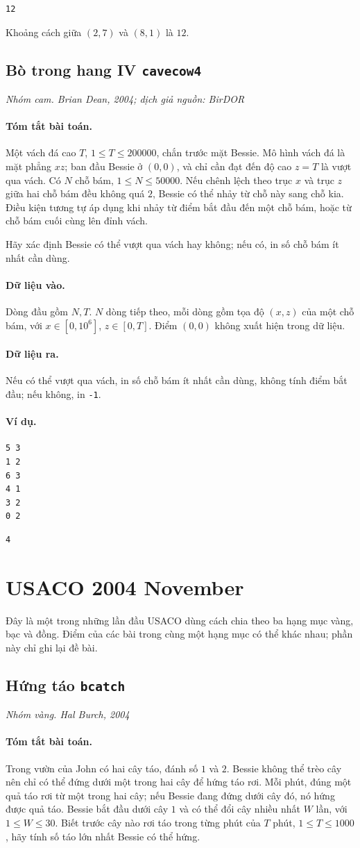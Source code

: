 \documentclass[11pt]{article}
\newcommand{\problem}[4]{%
  \subsection[#1 (#2)]{#1 \hfill {\normalsize\texttt{#2}}}%
  \noindent\textit{#3. #4}\par\smallskip
}
\newcommand{\iosec}[1]{\paragraph{#1}}
\begin{document}
\begin{verbatim}
12
\end{verbatim}

Khoảng cách giữa \((2,7)\) và \((8,1)\) là \(12\).

\problem{Bò trong hang IV}{cavecow4}{Nhóm cam}{Brian Dean, 2004; dịch giả nguồn: BirDOR}

\iosec{Tóm tắt bài toán.}
Một vách đá cao \(T\), \(1\le T\le 200000\), chắn trước mặt Bessie. Mô hình vách
đá là mặt phẳng \(xz\); ban đầu Bessie ở \((0,0)\), và chỉ cần đạt đến độ cao
\(z=T\) là vượt qua vách. Có \(N\) chỗ bám, \(1\le N\le 50000\). Nếu chênh lệch
theo trục \(x\) và trục \(z\) giữa hai chỗ bám đều không quá \(2\), Bessie có
thể nhảy từ chỗ này sang chỗ kia. Điều kiện tương tự áp dụng khi nhảy từ điểm
bắt đầu đến một chỗ bám, hoặc từ chỗ bám cuối cùng lên đỉnh vách.

Hãy xác định Bessie có thể vượt qua vách hay không; nếu có, in số chỗ bám ít
nhất cần dùng.

\iosec{Dữ liệu vào.}
Dòng đầu gồm \(N,T\). \(N\) dòng tiếp theo, mỗi dòng gồm tọa độ \((x,z)\) của
một chỗ bám, với \(x\in[0,10^6]\), \(z\in[0,T]\). Điểm \((0,0)\) không xuất
hiện trong dữ liệu.

\iosec{Dữ liệu ra.}
Nếu có thể vượt qua vách, in số chỗ bám ít nhất cần dùng, không tính điểm bắt
đầu; nếu không, in \texttt{-1}.

\iosec{Ví dụ.}
\begin{verbatim}
5 3
1 2
6 3
4 1
3 2
0 2
\end{verbatim}

\begin{verbatim}
4
\end{verbatim}

\section{USACO 2004 November}

Đây là một trong những lần đầu USACO dùng cách chia theo ba hạng mục vàng,
bạc và đồng. Điểm của các bài trong cùng một hạng mục có thể khác nhau; phần
này chỉ ghi lại đề bài.

\problem{Hứng táo}{bcatch}{Nhóm vàng}{Hal Burch, 2004}

\iosec{Tóm tắt bài toán.}
Trong vườn của John có hai cây táo, đánh số \(1\) và \(2\). Bessie không thể
trèo cây nên chỉ có thể đứng dưới một trong hai cây để hứng táo rơi. Mỗi phút,
đúng một quả táo rơi từ một trong hai cây; nếu Bessie đang đứng dưới cây đó,
nó hứng được quả táo. Bessie bắt đầu dưới cây \(1\) và có thể đổi cây nhiều
nhất \(W\) lần, với \(1\le W\le 30\). Biết trước cây nào rơi táo trong từng
phút của \(T\) phút, \(1\le T\le 1000\), hãy tính số táo lớn nhất Bessie có
thể hứng.
\end{document}
